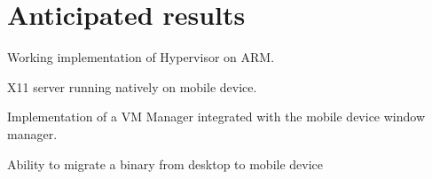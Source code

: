 \section{Anticipated results}
	\begin{itemize*}
	\item Working implementation of Hypervisor on ARM.
  \item X11 server running natively on mobile device.
	\item Implementation of a VM Manager integrated with the mobile device window manager.
	\item Ability to migrate a binary from desktop to mobile device
	\end{itemize*}
